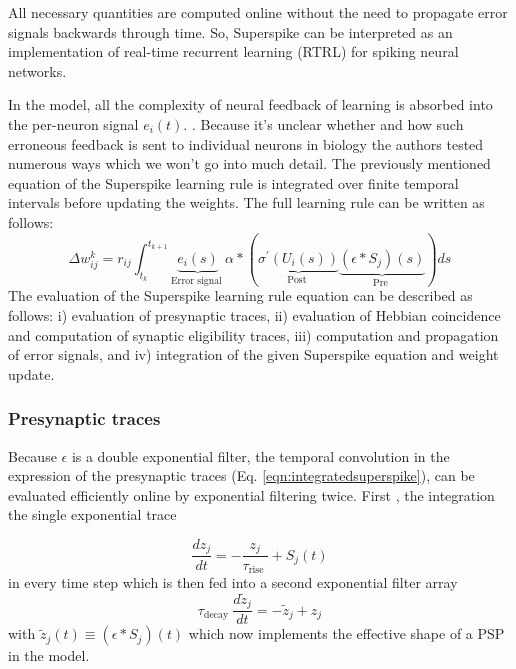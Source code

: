 \documentclass[12pt]{report}
\begin{document}
All necessary quantities are computed online without the need to propagate error signals backwards through time. So, Superspike can be interpreted as an implementation of real-time recurrent learning (RTRL) \cite{williams1989} for spiking neural networks. 

In the model, all the complexity of neural feedback of learning is absorbed into the per-neuron signal $e_{i}(t) .$ . Because it's unclear whether and how such erroneous feedback is sent to individual neurons in biology the authors tested numerous ways which we won't go into much detail. The previously mentioned equation of the Superspike learning rule is integrated  over finite temporal intervals before updating the weights. The full learning rule can be written as follows:
\begin{equation}
\label{eqn:integratedsuperspike}
\Delta w_{i j}^{k}=r_{i j} \int_{t_{k}}^{t_{k+1}} \underbrace{e_{i}(s)}_{\text {Error signal }} \alpha *(\underbrace{\sigma^{\prime}\left(U_{i}(s)\right)}_{\text {Post }} \underbrace{\left(\epsilon * S_{j}\right)(s)}_{\text {Pre }}) d s
\end{equation}
The evaluation of the Superspike learning rule equation can be described as follows: i) evaluation of presynaptic traces, ii) evaluation of Hebbian coincidence and computation of synaptic eligibility traces, iii) computation and propagation of error signals, and iv) integration of the given Superspike equation and weight update. 

\subsubsection{Presynaptic traces}
Because $\epsilon$ is a double exponential filter, the temporal convolution in the expression of the presynaptic traces (Eq. \ref{eqn:integratedsuperspike}), can be evaluated efficiently online by exponential filtering twice. First , the integration the single exponential trace

\begin{equation}
\frac{d z_{j}}{d t}=-\frac{z_{j}}{\tau_{\text {rise }}}+S_{j}(t)
\end{equation}
in every time step which is then fed into a second exponential filter array
\begin{equation}
\tau_{\text {decay }} \frac{d \tilde{z}_{j}}{d t}=-\tilde{z}_{j}+z_{j}
\end{equation}
with $\tilde{z}_{j}(t) \equiv\left(\epsilon * S_{j}\right)(t)$ which now implements the effective shape of a PSP in the model. 
\end{document}
